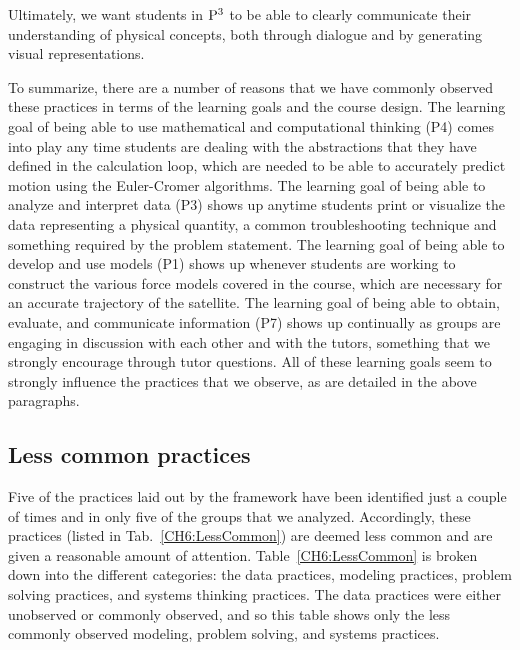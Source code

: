 \documentclass{msuphddissertation}
\begin{document}
\begin{doublespace}
Ultimately, we want students in ${\rm P}^{3}$ to be able to clearly communicate their understanding of physical concepts, both through dialogue and by generating visual representations.

%
%
%

To summarize, there are a number of reasons that we have commonly observed these practices in terms of the learning goals and the course design.  The learning goal of being able to use mathematical and computational thinking (P4) comes into play any time students are dealing with the abstractions that they have defined in the calculation loop, which are needed to be able to accurately predict motion using the Euler-Cromer algorithms.  The learning goal of being able to analyze and interpret data (P3) shows up anytime students print or visualize the data representing a physical quantity, a common troubleshooting technique and something required by the problem statement.  The learning goal of being able to develop and use models (P1) shows up whenever students are working to construct the various force models covered in the course, which are necessary for an accurate trajectory of the satellite.  The learning goal of being able to obtain, evaluate, and communicate information (P7) shows up continually as groups are engaging in discussion with each other and with the tutors, something that we strongly encourage through tutor questions.  All of these learning goals seem to strongly influence the practices that we observe, as are detailed in the above paragraphs.  %

%
%
%
%
%
%
%
%
%
%
%
%
%
%
%
%

\subsection{Less common practices}

Five of the practices laid out by the framework have been identified just a couple of times and in only five of the groups that we analyzed.  Accordingly, these practices (listed in Tab.~\ref{CH6:LessCommon}) are deemed less common and are given a reasonable amount of attention.  Table~\ref{CH6:LessCommon} is broken down into the different categories: the data practices, modeling practices, problem solving practices, and systems thinking practices.  The data practices were either unobserved or commonly observed, and so this table shows only the less commonly observed modeling, problem solving, and systems practices.


\end{doublespace}
\end{document}
